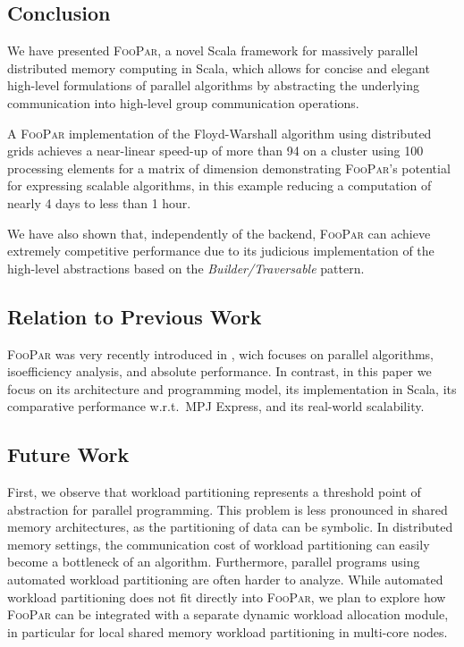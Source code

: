 \documentclass{article}
\newcommand{\framework}{{\rmfamily\scshape FooPar}\xspace}
\begin{document}
{\begin{algorithm}
{\section{Conclusion}
\label{sec:conclusion}

We have presented \framework, a novel Scala framework for massively parallel distributed memory
computing in Scala, which allows for concise and elegant high-level formulations of
parallel algorithms by abstracting the underlying communication into high-level group
communication operations.

A \framework implementation of the Floyd-Warshall algorithm using distributed grids achieves a near-linear speed-up of
more than 94 on a cluster using 100 processing elements for a matrix of dimension  demonstrating \framework's potential
for expressing scalable algorithms, in this example reducing a computation of nearly 4 days to less than 1 hour.

We have also shown that, independently of the backend, \framework can achieve extremely competitive performance due
to its judicious implementation of the high-level abstractions based on the \textit{Builder/Traversable} pattern.

\subsection{Relation to Previous Work}

\framework was very recently introduced in \cite{ppam13}, wich focuses on parallel algorithms, isoefficiency analysis, and absolute performance. In contrast, in this paper we focus on its architecture and programming model, its implementation in Scala, its comparative performance w.r.t.\ MPJ Express, and its real-world scalability.

\subsection{Future Work}

First, we observe that workload partitioning represents a threshold point of abstraction for parallel programming.
This problem is less pronounced in shared memory architectures, as the partitioning of data can be symbolic. In
distributed memory settings, the communication cost of workload partitioning can easily become a bottleneck of an algorithm.
Furthermore, parallel programs using automated workload partitioning are often harder to analyze.
While automated workload partitioning does not fit directly into \framework,
we plan to explore how \framework can be integrated with a separate dynamic workload allocation module,
in particular for local shared memory workload partitioning in multi-core nodes.

}
\end{algorithm}}
\end{document}
